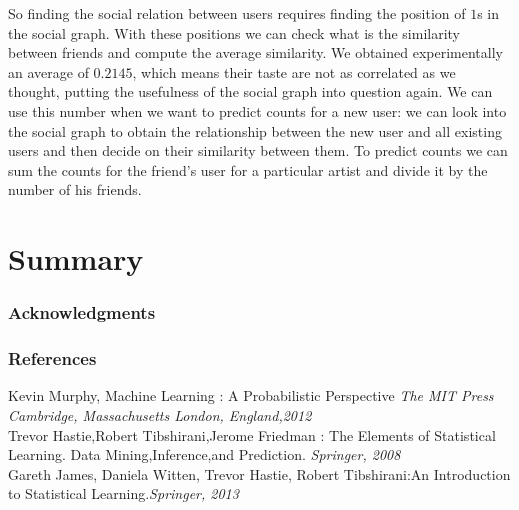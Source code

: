 \documentclass{article} %
\begin{document}
So finding the social relation between users requires finding the position of $1$s in the social graph. With these positions we can check what is the similarity between friends and compute the average similarity. We obtained experimentally an average of $0.2145$, which means their taste are not as correlated as we thought, putting the usefulness of the social graph into question again. We can use this number when we want to predict counts for a new user: we can look into the social graph to obtain the relationship between the new user and all existing users and then decide on their similarity between them. To predict counts we can sum the counts for the friend's user for a particular artist and divide it by the number of his friends.
\section{Summary}

\subsubsection*{Acknowledgments}

\subsubsection*{References}
Kevin Murphy, Machine Learning : A Probabilistic Perspective {\em The MIT Press
Cambridge, Massachusetts
London, England,2012}\\
Trevor Hastie,Robert Tibshirani,Jerome Friedman : The Elements of
Statistical Learning. Data Mining,Inference,and Prediction. {\em Springer, 2008}\\
Gareth James,
Daniela Witten,
Trevor Hastie,
Robert Tibshirani:An Introduction to Statistical Learning.{\em Springer, 2013}
\end{document}
